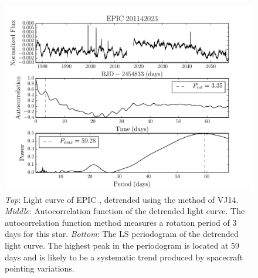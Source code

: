 \begin{figure}
\begin{center}
\includegraphics[width=6in, clip=true]{figures/rotation201142023.pdf}
\caption{{\it Top}: Light curve of EPIC \rpcc, detrended using the method
	of VJ14.
	{\it Middle}: Autocorrelation function of the detrended light curve.
	The autocorrelation function method measures a rotation period of 3
	days for this star.
	{\it Bottom}: The LS periodogram of the detrended light curve.
	The highest peak in the periodogram is located at 59 days and is likely
	to be a systematic trend produced by spacecraft pointing variations.}
\label{fig:rotation_poster_child2}
\end{center}
\end{figure}


